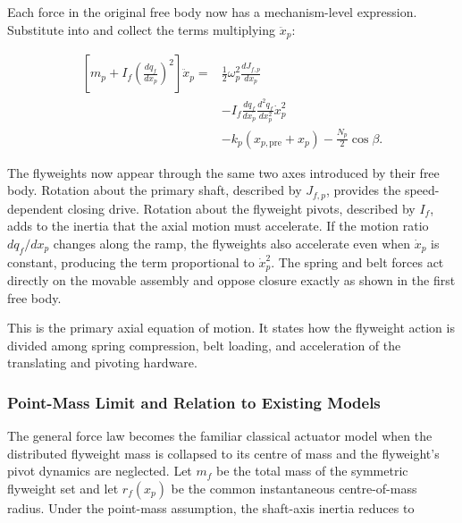 \documentclass[11pt]{report}
\numberwithin{equation}{section}
\newcounter{assump}
\begin{document}
Each force in the original free body now has a mechanism-level expression.
Substitute
 into
 and collect the terms multiplying
\(\ddot x_p\):

\begin{equation}
\boxed{
\begin{aligned}
    \left[
        m_p
        +
        I_f
        \left(\frac{dq_f}{dx_p}\right)^2
    \right]\ddot x_p
    ={}&
    \frac{1}{2}\omega_p^2\frac{dJ_{f,p}}{dx_p}
    \\
    &-
    I_f
    \frac{dq_f}{dx_p}
    \frac{d^2q_f}{dx_p^2}
    \dot x_p^2
    \\
    &-
    k_p\left(x_{p,\mathrm{pre}}+x_p\right)
    -
    \frac{N_p}{2}\cos\beta.
\end{aligned}
}
    \label{eq:completed_primary_axial_balance}
\end{equation}

The flyweights now appear through the same two axes introduced by their free
body. Rotation about the primary shaft, described by \(J_{f,p}\), provides
the speed-dependent closing drive. Rotation about the flyweight pivots,
described by \(I_f\), adds to the inertia that the axial motion must
accelerate. If the motion ratio \(dq_f/dx_p\) changes along the ramp, the
flyweights also accelerate even when \(\dot x_p\) is constant, producing the
term proportional to \(\dot x_p^2\). The spring and belt forces act directly
on the movable assembly and oppose closure exactly as shown in the first free
body.

This is the primary axial equation of motion. It states how the
flyweight action is divided among spring compression, belt loading, and
acceleration of the translating and pivoting hardware.

\subsubsection{Point-Mass Limit and Relation to Existing Models}
\label{sec:primary_classical_limit}

The general force law becomes the familiar classical actuator model when the
distributed flyweight mass is collapsed to its centre of mass and the
flyweight's pivot dynamics are neglected. Let \(m_f\) be the total mass of
the symmetric flyweight set and let \(r_f(x_p)\) be the common instantaneous
centre-of-mass radius. Under the point-mass assumption, the shaft-axis inertia
reduces to
\end{document}
